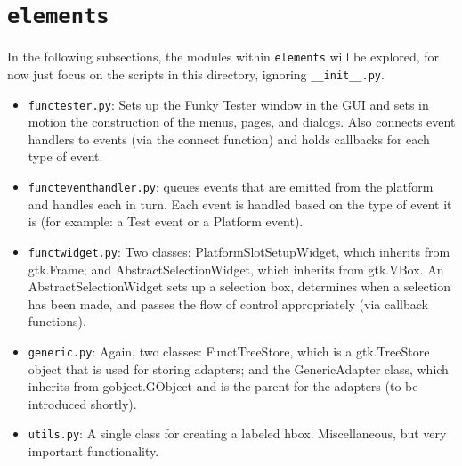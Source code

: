\documentclass{report}
\begin{document}
\section{\texttt{elements}}
In the following subsections, the modules within \texttt{elements} will be explored, for now just focus on the scripts in this directory, ignoring \texttt{\_\_init\_\_.py}.\\

	\begin{minipage}{\linewidth}
		\label{fig:ui/elements}
	\end{minipage}
		\vspace{5pt}%
		
\begin{itemize}
	\item \texttt{functester.py}: Sets up the Funky Tester window in the GUI and sets in motion the construction of the menus, pages, and dialogs. Also connects event handlers to events (via the connect function) and holds callbacks for each type of event. %
	\item \texttt{functeventhandler.py}: queues events that are emitted from the platform and handles each in turn. Each event is handled based on the type of event it is (for example: a Test event or a Platform event).
	\item \texttt{functwidget.py}: Two classes: PlatformSlotSetupWidget, which inherits from gtk.Frame; and AbstractSelectionWidget, which inherits from gtk.VBox. An AbstractSelectionWidget sets up a selection box, determines when a selection has been made, and passes the flow of control appropriately (via callback functions).
	\item \texttt{generic.py}: Again, two classes: FunctTreeStore, which is a gtk.TreeStore object that is used for storing adapters; and the GenericAdapter class, which inherits from gobject.GObject and is the parent for the adapters (to be introduced shortly).
	\item \texttt{utils.py}: A single class for creating a labeled hbox. Miscellaneous, but very important functionality.
\end{itemize}
\end{document}
